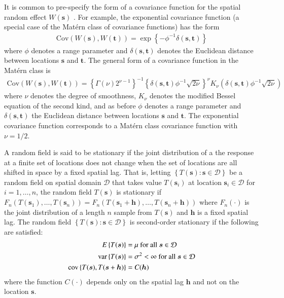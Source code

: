 \documentclass[authoryear, review, 11pt]{elsarticle}
\begin{document}
It is common to pre-specify the form of a covariance function for the spatial random effect $W(\bm{s})$ \citep{Diggle:2007}. For example, the exponential covariance function (a special case of the Mat\'{e}rn class of covariance functions) has the form
\begin{align}\label{eq:exponential-covariance}
    \text{Cov}(W(\bm{s}), W(\bm{t})) = \exp\left\{-\phi^{-1} \delta(\bm{s}, \bm{t}) \right\}
\end{align}
where $\phi$ denotes a range parameter and $\delta(\bm{s}, \bm{t})$ denotes the Euclidean distance between locations $\bm{s}$ and $\bm{t}$. The general form of a covariance function in the Mat\'{e}rn class is
\begin{align}\label{eq:matern-covarinace}
    \text{Cov}(W(\bm{s}), W(\bm{t})) = \left\{\Gamma(\nu) 2^{\nu-1} \right\}^{-1} \left\{\delta(\bm{s}, \bm{t}) \phi^{-1}\sqrt{2\nu}\right\}^\nu K_{\nu} \left(\delta(\bm{s}, \bm{t}) \phi^{-1}\sqrt{2\nu}\right)
    \end{align}
where $\nu$ denotes the degree of smoothness, $K_{\nu}$ denotes the modified Bessel equation of the second kind, and as before $\phi$ denotes a range parameter and $\delta(\bm{s}, \bm{t})$ the Euclidean distance between locations $\bm{s}$ and $\bm{t}$. The exponential covariance function corresponds to a Mat\'{e}rn class covariance function with $\nu = 1/2$.

	A random field is said to be stationary if the joint distribution of a the response at a finite set of locations does not change when the set of locations are all shifted in space by a fixed spatial lag. That is, letting $\left\{T(\bm{s}) : \bm{s} \in \mathcal{D}\right\}$ be a random field on spatial domain $\mathcal{D}$ that takes value $T(\bm{s}_i)$ at location $\bm{s}_i \in \mathcal{D}$ for $i = 1, \dots, n$, the random field $T(\bm{s})$ is stationary if $F_n\left(T(\bm{s}_1), \dots, T(\bm{s}_n)\right) = F_n\left(T(\bm{s}_1+\bm{h}), \dots, T(\bm{s}_n+\bm{h})\right)$ where $F_n(\cdot)$ is the joint distribution of a length $n$ sample from $T(\bm{s})$ and $\bm{h}$ is a fixed spatial lag. The random field $\left\{T(\bm{s}) : \bm{s} \in \mathcal{D}\right\}$ is second-order stationary if the following are satisfied:
	\begin{align}
		E\left\{ T(\bm{s}) \right\} &= \mu \text{ for all } \bm{s} \in \mathcal{D} \notag \\
		\text{var}\left\{T(\bm{s})\right\} &= \sigma^2 < \infty \text{ for all } \bm{s} \in \mathcal{D} \notag \\
		\text{cov}\left\{ T(\bm{s}), T(\bm{s} + \bm{h}) \right\} &= C(\bm{h})
	\end{align}
	where the function $C(\cdot)$ depends only on the spatial lag $\bm{h}$ and not on the location $\bm{s}$.
	
\end{document}
